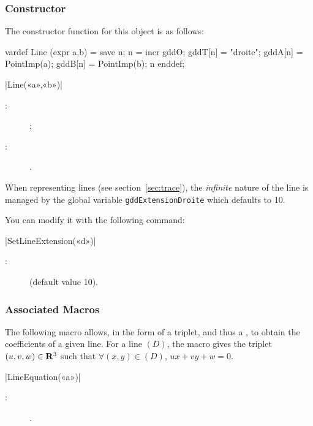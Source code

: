 \documentclass[a4paper,english]{article}
\begin{document}
\subsubsection{Constructor}

The constructor function for this object is as follows:
\begin{mpcode}
vardef Line (expr a,b) =
  save n; n = incr gddO;
  gddT[n] = "droite"; gddA[n] = PointImp(a); gddB[n] = PointImp(b); n
enddef;
\end{mpcode}
\begin{colourband}
\macro|Line(«a»,«b»)|
\begin{description}
  \item[:]   ;
  \item[:]  .
\end{description}
\end{colourband}
\bigskip


When representing lines (see section~\ref{sec:trace}), the \emph{infinite} nature of the line is managed by the global variable \lstinline+gddExtensionDroite+ 
which defaults to 10.

You can modify it with the following command:
\begin{colourband}
\macro|SetLineExtension(«d»)|
\begin{description}
  \item[:]   (default value 10).
\end{description}
\end{colourband}
\bigskip


\subsubsection{Associated Macros}

The following macro allows, in the form of a triplet, and thus a , to obtain the coefficients of a given line. For a line $(D)$, the macro gives the triplet $(u,v,w)\in\mathbf{R}^3$ such that $\forall (x,y)\in(D)$, $ux+vy+w=0$.

\begin{colourband}
\macro|LineEquation(«a»)|
\begin{description}
  \item[:]  .
\end{description}
\end{colourband}
\end{document}
